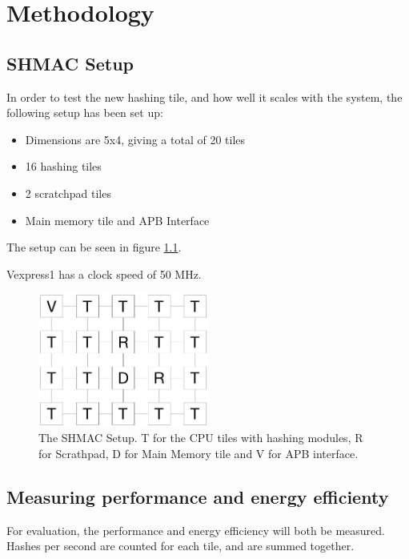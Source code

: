 \chapter{Methodology}
\label{cha:methodology}

\section{SHMAC Setup}
\label{sec:SHMAC_setup}
In order to test the new hashing tile, and how well it scales with the system, the following setup has been set up:
\begin{itemize}
    \item Dimensions are 5x4, giving a total of 20 tiles
    \item 16 hashing tiles
    \item 2 scratchpad tiles
    \item Main memory tile and APB Interface
\end{itemize}

The setup can be seen in figure \ref{fig:5x4}.

Vexpress1 has a clock speed of 50 MHz. 

\begin{figure}[htb]
    \centering
    \includegraphics[width=0.5\textwidth]{Figures/Measurements/5x4}
    \caption{The SHMAC Setup. T for the CPU tiles with hashing modules, R for Scrathpad, D for Main Memory tile and V for APB interface.}
    \label{fig:5x4}
\end{figure}

\section{Measuring performance and energy efficienty}
For evaluation, the performance and energy efficiency will both be measured.
Hashes per second are counted for each tile, and are summed together. 

